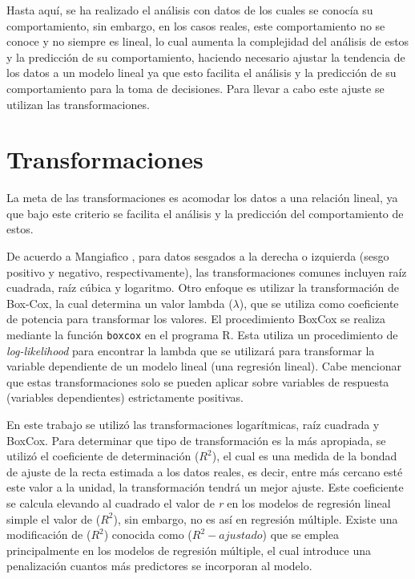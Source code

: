 \documentclass{article}
\begin{document}
Hasta aquí, se ha realizado el análisis con datos de los cuales se conocía su comportamiento, sin embargo, en los casos reales, este comportamiento no se conoce y no siempre es lineal, lo cual aumenta la complejidad del análisis de estos y la predicción de su comportamiento, haciendo necesario ajustar la tendencia de los datos a un modelo lineal ya que esto facilita el análisis y la predicción de su comportamiento para la toma de decisiones. Para llevar a cabo este ajuste se utilizan las transformaciones.

\section{Transformaciones}
La meta de las transformaciones es acomodar los datos a una relación lineal, ya que bajo este criterio se facilita el análisis y la predicción del comportamiento de estos.

De acuerdo a Mangiafico \cite{mangiafico}, para datos sesgados a la derecha o izquierda (sesgo positivo y negativo, respectivamente), las transformaciones comunes incluyen raíz cuadrada, raíz cúbica y logaritmo. Otro enfoque es utilizar la transformación de Box-Cox, la cual determina un valor lambda ($\lambda$), que se utiliza como coeficiente de potencia para transformar los valores. El procedimiento Box\textendash Cox se realiza mediante la función \texttt{boxcox} en el programa R. Esta utiliza un procedimiento de \textit{log-likelihood} para encontrar la lambda que se utilizará para transformar la variable dependiente de un modelo lineal (una regresión lineal). Cabe mencionar que estas transformaciones solo se pueden aplicar sobre variables de respuesta (variables dependientes) estrictamente positivas.

En este trabajo se utilizó las transformaciones logarítmicas, raíz cuadrada y Box\textendash Cox. Para determinar que tipo de transformación es la más apropiada, se utilizó el coeficiente de determinación ($R^2$), el cual es una medida de la bondad de ajuste de la recta estimada a los datos reales, es decir, entre más cercano esté este valor a la unidad, la transformación tendrá un mejor ajuste. Este coeficiente se calcula elevando al cuadrado el valor de \textit{r} en los modelos de regresión lineal simple el valor de ($R^2$), sin embargo, no es así en regresión múltiple. Existe una modificación de ($R^2$) conocida como ($R^2-ajustado$) que se emplea principalmente en los modelos de regresión múltiple, el cual introduce una penalización cuantos más predictores se incorporan al modelo.
\end{document}
